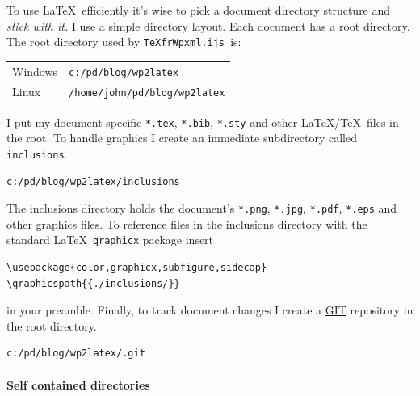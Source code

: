 To use \LaTeX\ efficiently it's wise to pick a document directory
structure and \emph{stick with it.} I use a simple directory layout. Each
document has a root directory. The root directory used by
\texttt{TeXfrWpxml.ijs~}is:

\begin{center}
\begin{tabular}{lp{}} 
   Windows          & \texttt{c:/pd/blog/wp2latex}  \\ 
   Linux            & \texttt{/home/john/pd/blog/wp2latex}            \\ 
\end{tabular}
\end{center}

\noindent I put my document specific \texttt{*.tex}, \texttt{*.bib},
\texttt{*.sty} and other \LaTeX/\TeX\ files in the root. To handle graphics
I create an immediate subdirectory called \texttt{inclusions}.
\begin{tcolorbox}[breakable, size=fbox, boxrule=1pt, pad at break*=1mm,colback=cellbackground, colframe=cellborder]
\begin{verbatim}
c:/pd/blog/wp2latex/inclusions
\end{verbatim}
\end{tcolorbox}
The inclusions directory holds the document's \texttt{*.png},
\texttt{*.jpg}, \texttt{*.pdf}, \texttt{*.eps} and other graphics files.
To reference files in the inclusions directory with the standard \LaTeX\
\texttt{graphicx} package insert
\begin{tcolorbox}[breakable, size=fbox, boxrule=1pt, pad at break*=1mm,colback=cellbackground, colframe=cellborder]
\begin{verbatim}
\usepackage{color,graphicx,subfigure,sidecap}
\graphicspath{{./inclusions/}}
\end{verbatim}
\end{tcolorbox}
in your preamble. Finally, to track document changes I create a
\href{http://git-scm.com/}{GIT} repository in the root directory.
\begin{tcolorbox}[breakable, size=fbox, boxrule=1pt, pad at break*=1mm,colback=cellbackground, colframe=cellborder]
\begin{verbatim}
c:/pd/blog/wp2latex/.git
\end{verbatim}
\end{tcolorbox}

\paragraph{Self contained directories}

